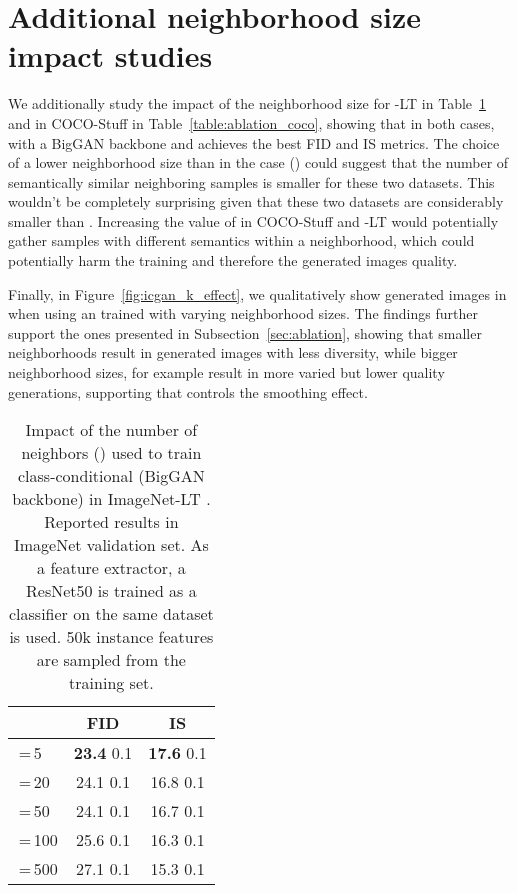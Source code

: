  
 
\section{Additional neighborhood size impact studies}
\label{app:k_size}
We additionally study the impact of the neighborhood size for \ImNet-LT in Table~\ref{table:ablation_lt} and in COCO-Stuff in Table~\ref{table:ablation_coco}, showing that in both cases, \ours with a BigGAN backbone and  achieves the best FID and IS metrics. The choice of a lower neighborhood size  than in the \ImNet case () could suggest that the number of semantically similar neighboring samples is smaller for these two datasets. This wouldn't be completely surprising given that these two datasets are considerably smaller than \ImNet. Increasing the value of  in COCO-Stuff and \ImNet-LT would potentially gather samples with different semantics within a neighborhood, which could potentially harm the training and therefore the generated images quality.
 
Finally, in Figure~\ref{fig:icgan_k_effect}, we qualitatively show generated images in \ImNet when using an \ours trained with varying neighborhood sizes. The findings further support the ones presented in Subsection~\ref{sec:ablation}, showing that smaller neighborhoods result in generated images with less diversity, while bigger neighborhood sizes, for example  result in more varied but lower quality generations, supporting that  controls the smoothing effect. 
 
 
 
\begin{table}[h]
\footnotesize 
\caption{Impact of the number of neighbors () used to train class-conditional \ours (BigGAN backbone) in ImageNet-LT . Reported results in ImageNet validation set. As a feature extractor, a ResNet50 is trained as a classifier on the same dataset is used. 50k instance features are sampled from the training set.}
\centering
\begin{tabular}{@{}lcc@{}}
\toprule
 & \textbf{FID} & \textbf{IS}  \\ \midrule
\,=\,5 & \textbf{23.4}  0.1 & \textbf{17.6}  0.1 \\ 
\,=\,20 & 24.1  0.1 & 16.8  0.1 \\ 
\,=\,50 & 24.1  0.1 & 16.7  0.1 \\ 
\,=\,100 & 25.6  0.1 & 16.3  0.1 \\
\,=\,500 & 27.1  0.1 & 15.3  0.1 \\ 
\bottomrule
\end{tabular}
\label{table:ablation_lt}
\end{table}
 
